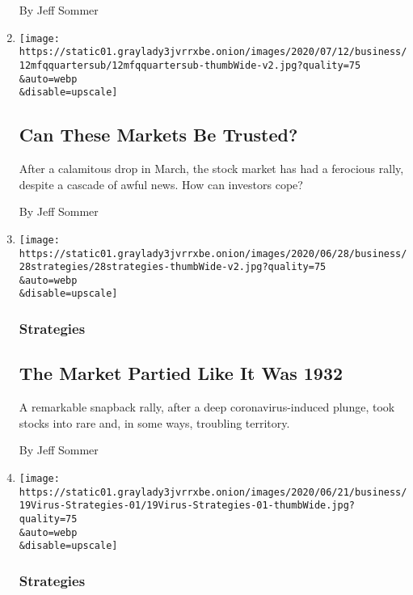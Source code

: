 \begin{enumerate}
  By Jeff Sommer
\item
  \href{/2020/07/11/business/mutual-fund-investing.html}{}

  \texttt{[image: https://static01.graylady3jvrrxbe.onion/images/2020/07/12/business/12mfqquartersub/12mfqquartersub-thumbWide-v2.jpg?quality=75\\\&auto=webp\\\&disable=upscale]}

  \hypertarget{can-these-markets-be-trusted}{%
  \subsection{Can These Markets Be
  Trusted?}\label{can-these-markets-be-trusted}}

  After a calamitous drop in March, the stock market has had a ferocious
  rally, despite a cascade of awful news. How can investors cope?

  By Jeff Sommer
\item
  \href{/2020/06/26/business/stock-market-prices-irrational.html}{}

  \texttt{[image: https://static01.graylady3jvrrxbe.onion/images/2020/06/28/business/28strategies/28strategies-thumbWide-v2.jpg?quality=75\\\&auto=webp\\\&disable=upscale]}

  \hypertarget{strategies-2}{%
  \subsubsection{Strategies}\label{strategies-2}}

  \hypertarget{the-market-partied-like-it-was-1932}{%
  \subsection{The Market Partied Like It Was
  1932}\label{the-market-partied-like-it-was-1932}}

  A remarkable snapback rally, after a deep coronavirus-induced plunge,
  took stocks into rare and, in some ways, troubling territory.

  By Jeff Sommer
\item
  \href{/2020/06/17/business/hertz-bankruptcy-stock-sale.html}{}

  \texttt{[image: https://static01.graylady3jvrrxbe.onion/images/2020/06/21/business/19Virus-Strategies-01/19Virus-Strategies-01-thumbWide.jpg?quality=75\\\&auto=webp\\\&disable=upscale]}

  \hypertarget{strategies-3}{%
  \subsubsection{Strategies}\label{strategies-3}}


\end{enumerate}
